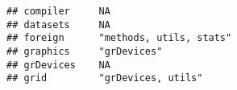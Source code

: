 \documentclass[]{book}
\begin{document}
\begin{verbatim}
## compiler     NA                                                                                                                                                                                                                                                                                                                                                                                                                                                                                                          
## datasets     NA                                                                                                                                                                                                                                                                                                                                                                                                                                                                                                          
## foreign      "methods, utils, stats"                                                                                                                                                                                                                                                                                                                                                                                                                                                                                     
## graphics     "grDevices"                                                                                                                                                                                                                                                                                                                                                                                                                                                                                                 
## grDevices    NA                                                                                                                                                                                                                                                                                                                                                                                                                                                                                                          
## grid         "grDevices, utils"                                                                                                                                                                                                                                                                                                                                                                                                                                                                                          

\end{verbatim}
\end{document}
